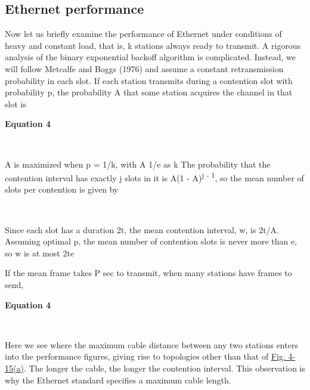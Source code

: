 \documentclass[b5paper,11pt]{memoir}
\begin{document}
\protect\hypertarget{0130661023_ch04lev1sec3.htmlux5cux23ch04lev2sec13}{}{}

\subsection{Ethernet performance}

Now let us briefly examine the performance of Ethernet under conditions
of heavy and constant load, that is, {k} stations always ready to
transmit. A rigorous analysis of the binary exponential backoff
algorithm is complicated. Instead, we will follow Metcalfe and Boggs
(1976) and assume a constant retransmission probability in each slot. If
each station transmits during a contention slot with probability {p},
the probability {A} that some station acquires the channel in that slot
is

\textbf{\protect\hypertarget{0130661023_ch04lev1sec3.htmlux5cux23ch04eq05}{}{}
Equation 4}


~

{A} is maximized when {p} = 1{/k}, with {A}
1{/e} as {k}
The probability that the contention interval has exactly {j} slots in it
is {A}(1 - {A}){\textsuperscript{j}} \textsuperscript{- 1}, so the mean
number of slots per contention is given by


~

Since each slot has a duration 2{t}, the mean contention interval, {w},
is 2{t}{/A.} Assuming optimal {p}, the mean number of contention slots
is never more than {e}, so {w} is at most 2{t}{e}

If the mean frame takes {P} sec to transmit, when many stations have
frames to send,

\textbf{\protect\hypertarget{0130661023_ch04lev1sec3.htmlux5cux23ch04eq06}{}{}
Equation 4}


~

Here we see where the maximum cable distance between any two stations
enters into the performance figures, giving rise to topologies other
than that of
\protect\hyperlink{0130661023_ch04lev1sec3.htmlux5cux23ch04fig15}{Fig.
4-15(a)}. The longer the cable, the longer the contention interval. This
observation is why the Ethernet standard specifies a maximum cable
length.
\end{document}

